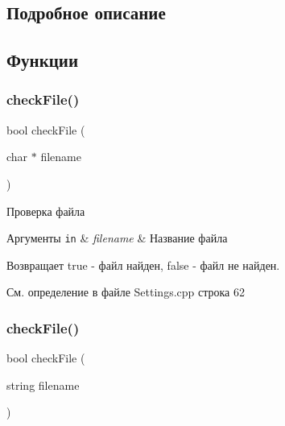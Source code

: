 \subsection{Подробное описание}


\subsection{Функции}
\mbox{\label{group__settingscpp_ga2dd1bc039652a0480c444957d416b6a6}} 
\subsubsection{\texorpdfstring{check\+File()}{checkFile()}\hspace{0.1cm}{\footnotesize\ttfamily [1/2]}}
{\footnotesize\ttfamily bool check\+File (\begin{DoxyParamCaption}\item[{char $\ast$}]{filename }\end{DoxyParamCaption})}



Проверка файла 


\begin{DoxyParams}[1]{Аргументы}
\mbox{\tt in}  & {\em filename} & Название файла \\
\hline
\end{DoxyParams}
\begin{DoxyReturn}{Возвращает}
true -\/ файл найден, false -\/ файл не найден. 
\end{DoxyReturn}


См. определение в файле Settings.\+cpp строка 62

\mbox{\label{group__settingscpp_ga64f8c9899c815dc180b2b564c0d05762}} 
\subsubsection{\texorpdfstring{check\+File()}{checkFile()}\hspace{0.1cm}{\footnotesize\ttfamily [2/2]}}
{\footnotesize\ttfamily bool check\+File (\begin{DoxyParamCaption}\item[{string}]{filename }\end{DoxyParamCaption})}




